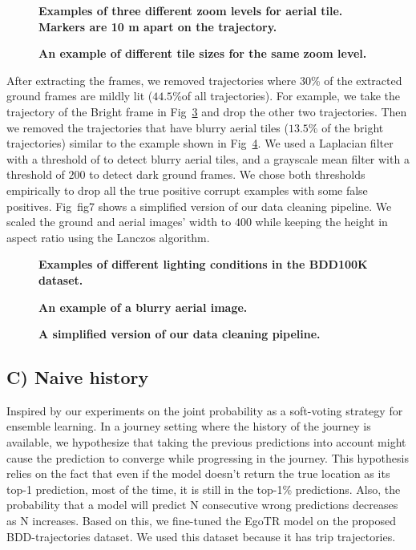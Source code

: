 \documentclass[10pt,letterpaper]{article}
\begin{document}
\begin{figure}[!h]
  \caption{{\bf Examples of three different zoom levels for aerial tile. Markers are 10 m apart on the trajectory.}}
  \label{fig3}
\end{figure}

\begin{figure}[!h]
  \caption{{\bf An example of different tile sizes for the same zoom level.}}
  \label{fig4}
\end{figure}

After extracting the frames, we removed trajectories where 30\% of the extracted ground frames are mildly lit ($44.5\%$of all trajectories). For example, we take the trajectory of the Bright frame in Fig~\ref{fig5} and drop the other two trajectories. Then we removed the trajectories that have blurry aerial tiles ($13.5\%$ of the bright trajectories) similar to the example shown in Fig~\ref{fig6}. We used a Laplacian filter~\cite{bib11} with a threshold of  to detect blurry aerial tiles, and a grayscale mean filter with a threshold of $200$ to detect dark ground frames. We chose both thresholds empirically to drop all the true positive corrupt examples with some false positives. Fig~{fig7} shows a simplified version of our data cleaning pipeline. We scaled the ground and aerial images’ width to $400$ while keeping the height in aspect ratio using the Lanczos algorithm.

\begin{figure}[!h]
  \caption{{\bf Examples of different lighting conditions in the BDD100K dataset.}}
  \label{fig5}
\end{figure}

\begin{figure}[!h]
  \caption{{\bf An example of a blurry aerial image.}}
  \label{fig6}
\end{figure}

\begin{figure}[!h]
  \caption{{\bf A simplified version of our data cleaning pipeline.}}
  \label{fig7}
\end{figure}

\subsection*{C) Naive history}
Inspired by our experiments on the joint probability as a soft-voting strategy for ensemble learning. In a journey setting where the history of the journey is available, we hypothesize that taking the previous predictions into account might cause the prediction to converge while progressing in the journey. This hypothesis relies on the fact that even if the model doesn't return the true location as its top-1 prediction, most of the time, it is still in the top-1\% predictions. Also, the probability that a model will predict N consecutive wrong predictions decreases as N increases. Based on this, we fine-tuned the EgoTR model on the proposed BDD-trajectories dataset. We used this dataset because it has trip trajectories.
\end{document}
